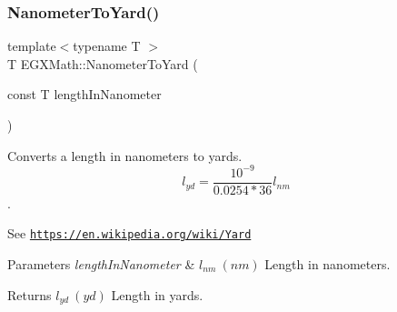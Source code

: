 \subsubsection{\texorpdfstring{Nanometer\+To\+Yard()}{NanometerToYard()}}
{\footnotesize\ttfamily template$<$typename T $>$ \\
T E\+G\+X\+Math\+::\+Nanometer\+To\+Yard (\begin{DoxyParamCaption}\item[{const T}]{length\+In\+Nanometer }\end{DoxyParamCaption})}



Converts a length in nanometers to yards. \[ l_{yd}= \frac{10^{-9}}{0.0254 * 36} l_{nm} \]. 

See \href{https://en.wikipedia.org/wiki/Yard}{\tt https\+://en.\+wikipedia.\+org/wiki/\+Yard} 
\begin{DoxyParams}{Parameters}
{\em length\+In\+Nanometer} & $ l_{nm}\ (nm)$ Length in nanometers. \\
\hline
\end{DoxyParams}
\begin{DoxyReturn}{Returns}
$ l_{yd}\ (yd)$ Length in yards. 
\end{DoxyReturn}
